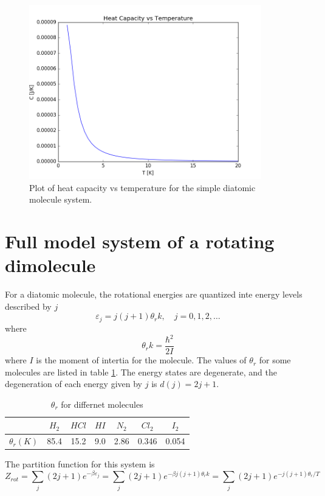 \documentclass[10pt,a4paper]{amsart}
\begin{document}
\begin{figure}[ht]
	\includegraphics[width=0.9\textwidth]{figures/heatcapsimple.png}
	\caption{Plot of heat capacity vs temperature for the simple 			diatomic molecule system.}
	\label{fig:heatcap1}
\end{figure}

\section{Full model system of a rotating dimolecule}

For a diatomic molecule, the rotational energies are quantized inte energy levels described by $j$
\begin{equation}
\varepsilon_j=j(j+1)\theta_r k, \quad j=0,1,2,\dots
\end{equation}
where
\begin{equation}
\theta_r k= \frac{\hbar^2}{2I}
\end{equation}
where $I$ is the moment of intertia for the molecule. The values of $\theta_r$ for some molecules are listed in table \ref{tab:thetar}. The energy states are degenerate, and the degeneration of each energy given by $j$ is $d(j)=2j+1$.

\begin{table}[ht]
	\centering
	\caption{$\theta_r$ for differnet molecules}
	\begin{tabular}{ccccccc} \hline
 	 & $H_2$ & $HCl$ & $HI$ & $N_2$ & $Cl_2$ & $I_2$ \\ \hline
	$\theta_r(K)$ & 85.4 & 15.2 & 9.0 & 2.86 & 0.346 & 0.054 \\ \hline
	\end{tabular}
	\label{tab:thetar}
\end{table} 

The partition function for this system is
\begin{equation}
Z_{rot} = \sum_j (2j + 1)e^{-\beta\varepsilon_j} 
        = \sum_j (2j + 1)e^{-\beta j(j+1)\theta_r k}
        = \sum_j (2j + 1)e^{-j(j+1)\theta_r/T}
\end{equation}
\end{document}
